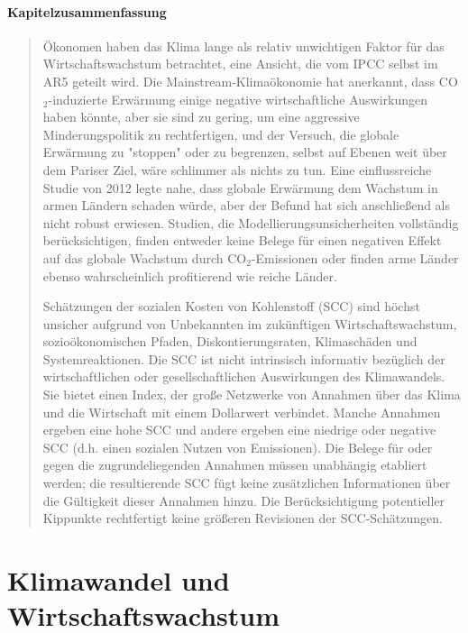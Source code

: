 \documentclass[12pt,paper=a4,DIV=12,parskip=never,chapterprefix=false,headings=standardclasses]{scrreprt}
\begin{document}
\paragraph{Kapitelzusammenfassung}
\begin{quote}
Ökonomen haben das Klima lange als relativ unwichtigen Faktor für das Wirtschaftswachstum betrachtet, eine Ansicht, die vom IPCC selbst im AR5 geteilt wird. Die Mainstream-Klimaökonomie hat anerkannt, dass CO$_2$-induzierte Erwärmung einige negative wirtschaftliche Auswirkungen haben könnte, aber sie sind zu gering, um eine aggressive Minderungspolitik zu rechtfertigen, und der Versuch, die globale Erwärmung zu "stoppen" oder zu begrenzen, selbst auf Ebenen weit über dem Pariser Ziel, wäre schlimmer als nichts zu tun. Eine einflussreiche Studie von 2012 legte nahe, dass globale Erwärmung dem Wachstum in armen Ländern schaden würde, aber der Befund hat sich anschließend als nicht robust erwiesen. Studien, die Modellierungsunsicherheiten vollständig berücksichtigen, finden entweder keine Belege für einen negativen Effekt auf das globale Wachstum durch CO$_2$-Emissionen oder finden arme Länder ebenso wahrscheinlich profitierend wie reiche Länder.

Schätzungen der sozialen Kosten von Kohlenstoff (SCC) sind höchst unsicher aufgrund von Unbekannten im zukünftigen Wirtschaftswachstum, sozioökonomischen Pfaden, Diskontierungsraten, Klimaschäden und Systemreaktionen. Die SCC ist nicht intrinsisch informativ bezüglich der wirtschaftlichen oder gesellschaftlichen Auswirkungen des Klimawandels. Sie bietet einen Index, der große Netzwerke von Annahmen über das Klima und die Wirtschaft mit einem Dollarwert verbindet. Manche Annahmen ergeben eine hohe SCC und andere ergeben eine niedrige oder negative SCC (d.h. einen sozialen Nutzen von Emissionen). Die Belege für oder gegen die zugrundeliegenden Annahmen müssen unabhängig etabliert werden; die resultierende SCC fügt keine zusätzlichen Informationen über die Gültigkeit dieser Annahmen hinzu. Die Berücksichtigung potentieller Kippunkte rechtfertigt keine größeren Revisionen der SCC-Schätzungen.
\end{quote}

\section{Klimawandel und Wirtschaftswachstum}
\end{document}
